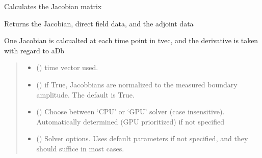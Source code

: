 \documentclass[letterpaper,10pt,english]{sphinxmanual}
\begin{document}
\begin{fulllineitems}
\begin{fulllineitems}
\label{\detokenize{_autosummary/nirfasterff.base.dcs_mesh.dcsmesh:nirfasterff.base.dcs_mesh.dcsmesh.jacobian}}
\pysigstartsignatures
{}
\pysigstopsignatures
\sphinxAtStartPar
Calculates the Jacobian matrix

\sphinxAtStartPar
Returns the Jacobian, direct field data, and the adjoint data

\sphinxAtStartPar
One Jacobian is calcualted at each time point in tvec, and the derivative is taken with regard to aDb
\begin{quote}\begin{description}
\begin{itemize}
\item {} 
\sphinxAtStartPar
{} () \textendash{} time vector used.

\item {} 
\sphinxAtStartPar
{} (\sphinxstyleliteralemphasis{\sphinxupquote{, }}) \textendash{} if True, Jacobbians are normalized to the measured boundary amplitude. The default is True.

\item {} 
\sphinxAtStartPar
{} (\sphinxstyleliteralemphasis{\sphinxupquote{, }}) \textendash{} Choose between ‘CPU’ or ‘GPU’ solver (case insensitive). Automatically determined (GPU prioritized) if not specified

\item {} 
\sphinxAtStartPar
{} ({\hyperref[\detokenize{_autosummary/nirfasterff.utils.SolverOptions:nirfasterff.utils.SolverOptions}]{}}\sphinxstyleliteralemphasis{\sphinxupquote{, }}) \textendash{} 
\sphinxAtStartPar
Solver options. Uses default parameters if not specified, and they should suffice in most cases.


\end{itemize}
\end{description}
\end{quote}
\end{fulllineitems}
\end{fulllineitems}
\end{document}
